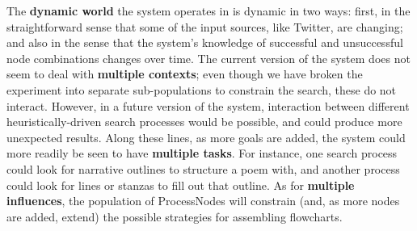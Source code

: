 The \textbf{dynamic world} the system operates in is dynamic in two
ways: first, in the straightforward sense that some of the input
sources, like Twitter, are changing; and also in the sense that the
system's knowledge of successful and unsuccessful node combinations
changes over time.  The current version of the system does not seem to
deal with \textbf{multiple contexts}; even though we have broken the
experiment into separate sub-populations to constrain the search,
these do not interact.  However, in a future version of the system,
interaction between different heuristically-driven search processes
would be possible, and could produce more unexpected results.  Along
these lines, as more goals are added, the system could more readily be
seen to have \textbf{multiple tasks}.  For instance, one search
process could look for narrative outlines to structure a poem with,
and another process could look for lines or stanzas to fill out that
outline.  As for \textbf{multiple influences}, the population of
ProcessNodes will constrain (and, as more nodes are added, extend) the
possible strategies for assembling flowcharts.

